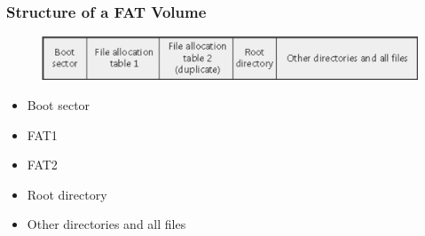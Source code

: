 \iffalse
% 
% 
% 
% 
\begin{frame}[fragile]
    \frametitle{Structure of a FAT Volume}
        \begin{figure}
        \includegraphics[width=1.0\linewidth]{figs/FAT-volume.png}
        \end{figure}
    \begin{itemize}
        \item Boot sector \pause
        \item FAT1
        \item FAT2
        \item Root directory \pause
        \item Other directories and all files
    \end{itemize}
\end{frame}
% 
% 
% 
